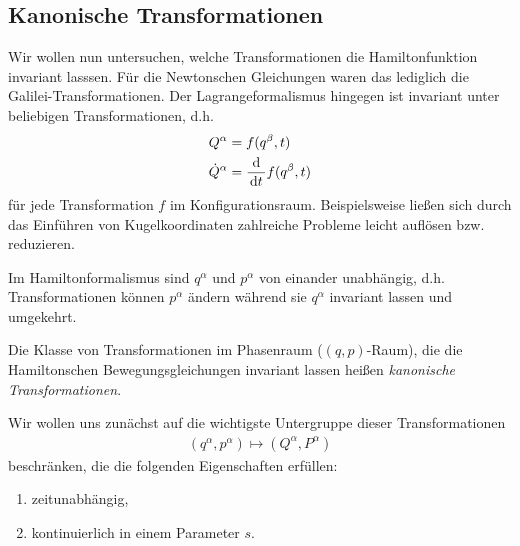 \subsection{Kanonische Transformationen}
 
Wir wollen nun untersuchen, welche Transformationen die Hamiltonfunktion
invariant lasssen. Für die Newtonschen Gleichungen waren das lediglich die
Galilei-Transformationen. Der Lagrangeformalismus hingegen ist invariant unter
beliebigen Transformationen, d.h.
 \begin{align*}
 &Q^\alpha = f(q^\beta,t)\\
 &\dot{Q}^\alpha = \frac{\mathrm{d}}{\,\mathrm{d} t\,}f(q^\beta,t)
 \end{align*}
für jede Transformation $f$ im Konfigurationsraum. Beispielsweise ließen sich
durch das Einführen von Kugelkoordinaten zahlreiche Probleme leicht auflösen bzw. reduzieren.

 Im Hamiltonformalismus sind $q^\alpha$ und $p^\alpha$ von einander unabhängig,
 d.h. Transformationen können $p^\alpha$ ändern während sie $q^\alpha$ invariant
 lassen und umgekehrt.

Die Klasse von Transformationen im Phasenraum ($(q,p)$-Raum), die die
Hamiltonschen Bewegungsgleichungen
invariant lassen heißen \emph{kanonische Transformationen}.

Wir wollen uns zunächst auf die wichtigste Untergruppe dieser Transformationen
\begin{align*}
(q^\alpha,p^\alpha)\mapsto (Q^\alpha,P^\alpha)
\end{align*}
beschränken, die die folgenden Eigenschaften erfüllen:
\begin{enumerate}[label=(\roman{*})]
  \item zeitunabhängig,
  \item kontinuierlich in einem Parameter $s$.
\end{enumerate}

